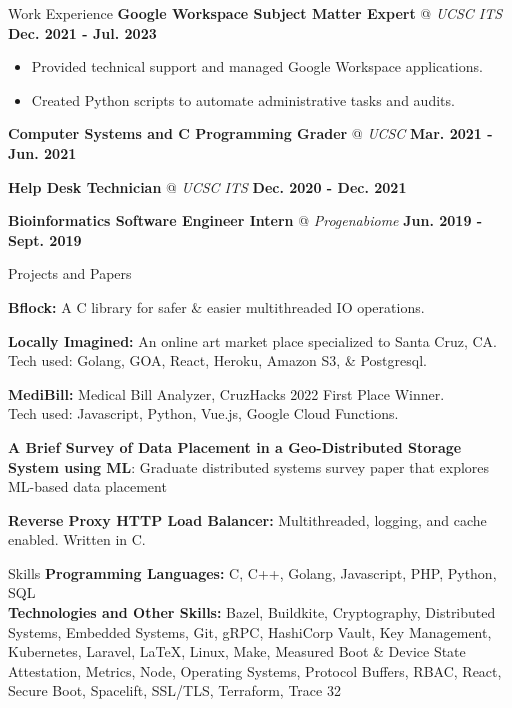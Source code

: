 \documentclass{resume} %
\begin{document}
\begin{rSection}{Work Experience}
    {\textbf{Google Workspace Subject Matter Expert} @ \textit{UCSC ITS} }
    \hfill{\textbf {Dec. 2021 - Jul. 2023}}
    \vspace{-0.65em}
    \begin{itemize}[noitemsep]
        \item Provided technical support and managed Google Workspace applications.
        \item Created Python scripts to automate administrative tasks and audits.
    \end{itemize}

    {\textbf{Computer Systems and C Programming Grader} @ \textit{UCSC} }
    \hfill{\textbf {Mar. 2021 - Jun. 2021}}

    {\textbf{Help Desk Technician} @ \textit{UCSC ITS}}
    \hfill{\textbf {Dec. 2020 - Dec. 2021}}
    
    {\textbf{Bioinformatics Software Engineer Intern} @ \textit{Progenabiome}}
    \hfill{\textbf {Jun. 2019 - Sept. 2019}}

\end{rSection}

\begin{rSection}{Projects and Papers}

    {\textbf{Bflock:}} A C library for safer \& easier multithreaded IO operations.
    
    {\textbf{Locally Imagined:}} An online art market place specialized to Santa Cruz, CA.
    \\ Tech used: Golang, GOA, React, Heroku, Amazon S3, \& Postgresql.
    
    {\textbf{MediBill:}} Medical Bill Analyzer, CruzHacks 2022 First Place Winner.
    \\Tech used: Javascript, Python, Vue.js, Google Cloud Functions.

    {\textbf{A Brief Survey of Data Placement in a Geo-Distributed Storage System using ML}: Graduate distributed systems survey paper that explores ML-based data placement} 

    {\textbf{Reverse Proxy HTTP Load Balancer:} } Multithreaded, logging, and cache enabled. Written in C.
\end{rSection}

\begin{rSection}{Skills}
    {\textbf{Programming Languages:} } C, C++, Golang, Javascript, PHP, Python, SQL
    \\{\textbf{Technologies and Other Skills:} }
    Bazel, Buildkite, Cryptography, Distributed Systems, Embedded Systems, Git, gRPC, HashiCorp Vault, Key Management, Kubernetes, Laravel, LaTeX, Linux, Make, Measured Boot \& Device State Attestation, Metrics, Node, Operating Systems, Protocol Buffers, RBAC, React, Secure Boot, Spacelift, SSL/TLS, Terraform, Trace 32
\end{rSection}
    
\end{document}
